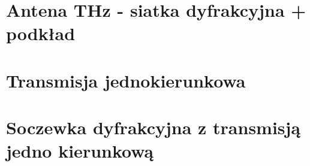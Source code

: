 

\section{Antena THz - siatka dyfrakcyjna + podkład}


\section{Transmisja jednokierunkowa}
\section{Soczewka dyfrakcyjna z transmisją jedno kierunkową}
